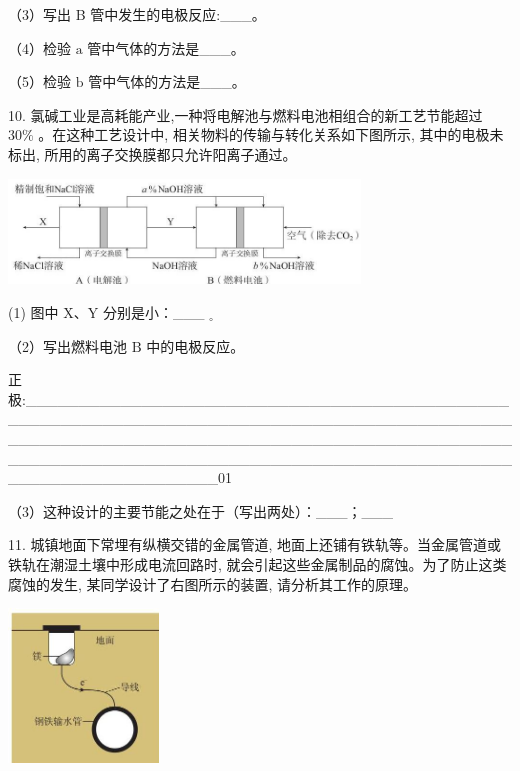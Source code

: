 \documentclass[10pt]{article}
\begin{document}
（3）写出 B 管中发生的电极反应:\_\_\_。

（4）检验 \(\mathrm{a}\) 管中气体的方法是\_\_\_。

（5）检验 \(\mathrm{b}\) 管中气体的方法是\_\_\_。

10. 氯碱工业是高耗能产业,一种将电解池与燃料电池相组合的新工艺节能超过 \({30}\%\) 。在这种工艺设计中, 相关物料的传输与转化关系如下图所示, 其中的电极未标出, 所用的离子交换膜都只允许阳离子通过。

\begin{center}
\includegraphics[max width=0.7\textwidth]{images/0190da9d-8bfd-732f-bc2c-0b21d0f13b91_126_969406.jpg}
\end{center}

(1) 图中 \(\mathrm{X}\text{、}\mathrm{Y}\) 分别是小：\_\_\_ \({}_{ \circ }\)

（2）写出燃料电池 \(\mathrm{B}\) 中的电极反应。

正极:\_\_\_\_\_\_\_\_\_\_\_\_\_\_\_\_\_\_\_\_\_\_\_\_\_\_\_\_\_\_\_\_\_\_\_\_\_\_\_\_\_\_\_\_\_\_\_\_\_\_\_\_\_\_\_\_\_\_\_\_\_\_\_\_\_\_\_\_\_\_\_\_\_\_\_\_\_\_\_\_\_\_\_\_\_\_\_\_\_\_\_\_\_\_\_\_\_\_\_\_\_\_\_\_\_\_\_\_\_\_\_\_\_\_\_\_\_\_\_\_\_\_\_\_\_\_\_\_\_\_\_\_\_\_\_\_\_\_\_\_\_\_\_\_\_\_\_\_\_\_\_\_\_\_\_\_\_\_\_\_\_\_\_\_\_\_\_\_\_\_\_\_\_\_\_\_\_\_\_\_\_\_\_\_\_\_\_\_\_\_\_\_\_\_\_\_\_\_\_\_\_\_\_\_\_\_\_\_\_\_01

（3）这种设计的主要节能之处在于（写出两处）：\_\_\_；\_\_\_

11. 城镇地面下常埋有纵横交错的金属管道, 地面上还铺有铁轨等。当金属管道或铁轨在潮湿土壤中形成电流回路时, 就会引起这些金属制品的腐蚀。为了防止这类腐蚀的发生, 某同学设计了右图所示的装置, 请分析其工作的原理。

\begin{center}
\includegraphics[max width=0.3\textwidth]{images/0190da9d-8bfd-732f-bc2c-0b21d0f13b91_126_852973.jpg}
\end{center}
\end{document}
